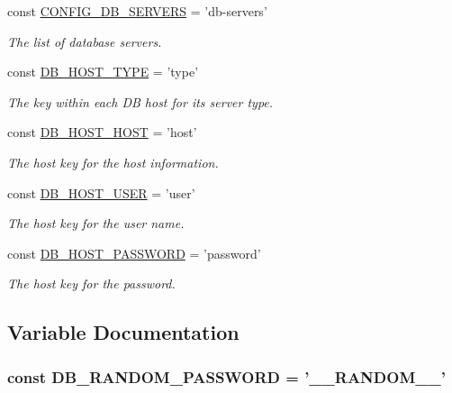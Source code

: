 \begin{DoxyCompactItemize}
const \hyperlink{group__config_ga318a2351a501b3e084a61a6c123177fb}{C\-O\-N\-F\-I\-G\-\_\-\-D\-B\-\_\-\-S\-E\-R\-V\-E\-R\-S} = 'db-\/servers'
\begin{DoxyCompactList}\small\item\em The list of database servers. \end{DoxyCompactList}\item 
const \hyperlink{group__db__settings_gace3d907644caa2a00fd88be83d7cd9f6}{D\-B\-\_\-\-H\-O\-S\-T\-\_\-\-T\-Y\-P\-E} = 'type'
\begin{DoxyCompactList}\small\item\em The key within each D\-B host for its server type. \end{DoxyCompactList}\item 
const \hyperlink{group__db__settings_ga25fb9cd75f17f870d6a1ddaf07f0f721}{D\-B\-\_\-\-H\-O\-S\-T\-\_\-\-H\-O\-S\-T} = 'host'
\begin{DoxyCompactList}\small\item\em The host key for the host information. \end{DoxyCompactList}\item 
const \hyperlink{group__db__settings_ga7bd8e811e8962d0012ef554ae225a477}{D\-B\-\_\-\-H\-O\-S\-T\-\_\-\-U\-S\-E\-R} = 'user'
\begin{DoxyCompactList}\small\item\em The host key for the user name. \end{DoxyCompactList}\item 
const \hyperlink{group__db__settings_gac58c46784855cd146a68b4aa1e092857}{D\-B\-\_\-\-H\-O\-S\-T\-\_\-\-P\-A\-S\-S\-W\-O\-R\-D} = 'password'
\begin{DoxyCompactList}\small\item\em The host key for the password. \end{DoxyCompactList}\end{DoxyCompactItemize}


\subsection{Variable Documentation}
\hypertarget{DatabaseConfigurationPlugin_8class_a5ecc138658687e351751a4a6e3cad639}{
\subsubsection[{D\-B\-\_\-\-R\-A\-N\-D\-O\-M\-\_\-\-P\-A\-S\-S\-W\-O\-R\-D}]{\setlength{\rightskip}{0pt plus 5cm}const D\-B\-\_\-\-R\-A\-N\-D\-O\-M\-\_\-\-P\-A\-S\-S\-W\-O\-R\-D = '\-\_\-\-\_\-\-R\-A\-N\-D\-O\-M\-\_\-\-\_\-'}}\label{DatabaseConfigurationPlugin_8class_a5ecc138658687e351751a4a6e3cad639}
